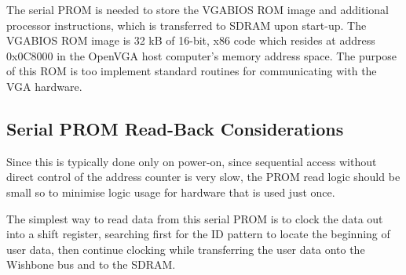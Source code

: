 The serial PROM is needed to store the VGABIOS ROM image and additional
processor instructions, which is transferred to SDRAM upon start-up. The VGABIOS
ROM image is 32 kB of 16-bit, x86 code which resides at address 0x0C8000 in the
OpenVGA host computer's memory address space\cite{SVGA_Book}. The purpose of
this ROM is too implement standard routines for communicating with the VGA hardware.


\subsection{Serial PROM Read-Back Considerations}
Since this is typically done only on power-on, since sequential access without
direct control of the address counter is very slow, the PROM read logic should
be small so to minimise logic usage for hardware that is used just once.

The simplest way to read data from this serial PROM is to clock the data out
into a shift register, searching first for the ID pattern to locate the
beginning of user data, then continue clocking while transferring the user data
onto the Wishbone bus and to the SDRAM.
